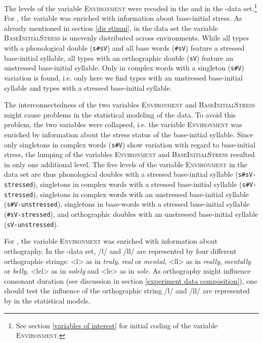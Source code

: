 The levels of the variable \textsc{Environment} were recoded in the  and in the -data set.\footnote{See section \ref{variables of interest} for initial coding of the variable \textsc{Environment.}} 
 For , the variable was enriched with information about base-initial stress. 
 As already mentioned in section \ref {dis stimui}, in the data set the variable \textsc{BaseInitialStress} is unevenly distributed across environments.  While all types with a phonological double (\texttt{s\#sV}) and all base words (\texttt{\#sV}) feature a stressed base-initial syllable, all types with an orthographic double (\texttt{sV}) feature an unstressed base-initial syllable. Only in complex words with a singleton (\texttt{s\#V}) variation is found, i.e. only here we find types with an unstressed base-initial syllable and types with a stressed base-initial syllable. 
 
 The interconnectedness of the two variables \textsc{Environment} and \textsc{BaseInitialStress} might cause problems in  the statistical modeling of the data. To avoid this problem, the two variables were collapsed, i.e. the variable \textsc{Environment} was enriched by information about the stress status of the base-initial syllable. Since only singletons in complex words (\texttt{s\#V}) show variation with regard to base-initial stress, the lumping of the variables \textsc{Environment} and \textsc{BaseInitialStress} resulted in only one additional level. 
 The five levels of the variable \textsc{Environment} in the data set are thus phonological doubles with a stressed base-initial syllable (\texttt{s\#sV-stressed}), singletons in complex words with a stressed base-initial syllable (\texttt{s\#V-stressed}), singletons in complex words with an unstressed base-initial syllable (\texttt{s\#V-unstressed}), singletons in base-words with a stressed base-initial syllable (\texttt{\#sV-stressed}), and orthographic doubles with an unstressed base-initial syllable (\texttt{sV-unstressed}).

 For , the variable \textsc{Environment} was enriched with information about orthography. 
In the -data set, /l/ and /ll/ are represented by four different orthographic strings:  <l> as in \textit{truly},  \textit{real} or \textit{mental}, <ll> as in \textit{really}, \textit{mentally} or \textit{belly}, <lel> as in \textit{solely} and <le> as in \textit{sole}. As orthography might influence consonant duration (see discussion in section \ref{experiment data composition}), one should test the influence of the orthographic string /l/ and /ll/ are represented by in the statistical models.






